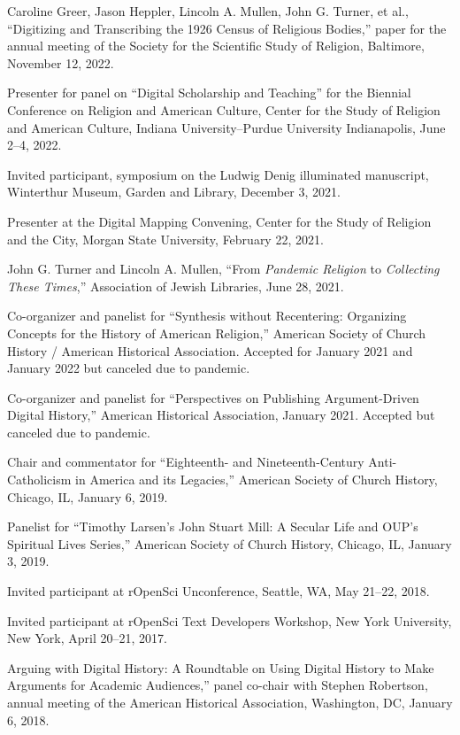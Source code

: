 \documentclass[11pt]{article}
\begin{document}
Caroline Greer, Jason Heppler, Lincoln A. Mullen, John G. Turner, et al., ``Digitizing and Transcribing the 1926 Census of Religious Bodies,'' paper for the annual meeting of the Society for the Scientific Study of Religion, Baltimore, November 12, 2022.

Presenter for panel on ``Digital Scholarship and Teaching'' for the Biennial Conference on Religion and American Culture, Center for the Study of Religion and American Culture, Indiana University–Purdue University Indianapolis, June 2--4, 2022.

Invited participant, symposium on the Ludwig Denig illuminated manuscript, Winterthur Museum, Garden and Library, December 3, 2021.

Presenter at the Digital Mapping Convening, Center for the Study of Religion and the City, Morgan State University, February 22, 2021.

John G. Turner and Lincoln A. Mullen, ``From \emph{Pandemic Religion} to \emph{Collecting These Times},'' Association of Jewish Libraries, June 28, 2021.

Co-organizer and panelist for ``Synthesis without Recentering: Organizing Concepts for the History of American Religion,'' American Society of Church History / American Historical Association. Accepted for January 2021 and January 2022 but canceled due to pandemic.

Co-organizer and panelist for ``Perspectives on Publishing Argument-Driven Digital History,'' American Historical Association, January 2021. Accepted but canceled due to pandemic.

Chair and commentator for ``Eighteenth- and Nineteenth-Century Anti-Catholicism in America and its Legacies,'' American Society of Church History, Chicago, IL, January 6, 2019.

Panelist for ``Timothy Larsen's John Stuart Mill: A Secular Life and OUP's Spiritual Lives Series,'' American Society of Church History, Chicago, IL, January 3, 2019.

Invited participant at rOpenSci Unconference, Seattle, WA, May 21--22, 2018.

Invited participant at rOpenSci Text Developers Workshop, New York University, New York, April 20--21, 2017.

\noindent{}Arguing with Digital History: A Roundtable on Using Digital History to Make Arguments for Academic Audiences,'' panel co-chair with Stephen Robertson, annual meeting of the American Historical Association, Washington, DC, January 6, 2018.
\end{document}
